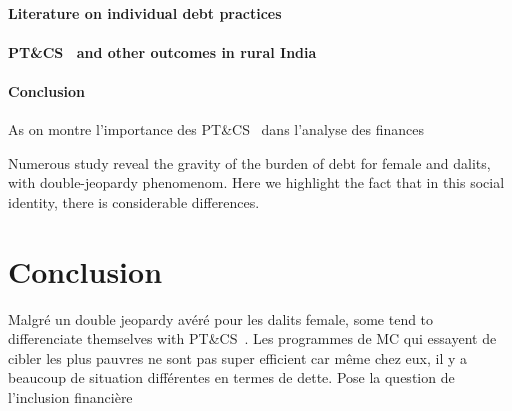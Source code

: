 \documentclass[a4paper, 11pt, onecolumn]{article}
\newcommand{\PTCS}{PT\&CS}
\begin{document}
\paragraph{Literature on individual debt practices}

\paragraph{\PTCS~ and other outcomes in rural India}

\paragraph{Conclusion}
As \cite{Brown2014} on montre l'importance des \PTCS~ dans l'analyse des finances


Numerous study reveal the gravity of the burden of debt for female and dalits, with double-jeopardy phenomenom. 
Here we highlight the fact that in this social identity, there is considerable differences.




\section{Conclusion}
\label{Conclusion}

Malgré un double jeopardy avéré pour les dalits female, some tend to differenciate themselves with \PTCS~.
Les programmes de MC qui essayent de cibler les plus pauvres ne sont pas super efficient car même chez eux, il y a beaucoup de situation différentes en termes de dette.
Pose la question de l'inclusion financière


\clearpage
\newpage
%




\newpage
\appendix
{}




\end{document}

